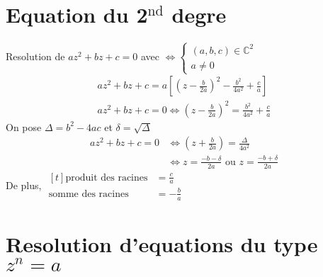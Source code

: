 \documentclass[12pt,a4paper]{article}
\begin{document}
	\section{Equation du 2$^{\text{nd}}$ degre}
		Resolution de $az^2+bz+c=0$ avec $\iff \left\{\begin{aligned}(a,b,c)\in\mathbb{C}^2\\a\neq0\end{aligned}\right.$\\
		$$\begin{aligned}
			az^2+bz+c=a\left[\left(z-\frac{b}{2a}\right)^2-\frac{b^2}{4a^2}+\frac{c}{a}\right] \\
			az^2+bz+c=0\iff\left(z-\frac{b}{2a}\right)^2=\frac{b^2}{4a^2}+\frac{c}{a}
		\end{aligned}$$
		On pose $\Delta=b^2-4ac$ et $\delta=\sqrt{\Delta}$ \\
		$$\begin{aligned}
			az^2+bz+c=0 &\iff \left(z+\frac{b}{2a}\right)=\frac{\Delta}{4a^2} \\
			&\iff z=\frac{-b-\delta}{2a}\text{ ou }z=\frac{-b+\delta}{2a}
		\end{aligned}$$
		De plus, $\begin{aligned}[t]\text{produit des racines}&=\frac{c}{a}\\\text{somme des racines}&=-\frac{b}{a}\end{aligned}$ \\
	\section{Resolution d'equations du type $z^n=a$}
\end{document}
